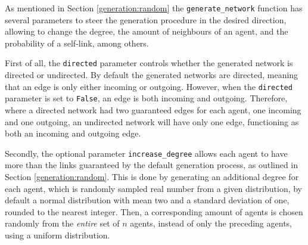 \documentclass[a4paper, 12pt]{report}
\begin{document}
As mentioned in Section \ref{generation:random} the \texttt{generate\_network} function has several parameters to steer the generation procedure in the desired direction, allowing to change the degree, the amount of neighbours of an agent, and the probability of a self-link, among others. 

\noindent First of all, the \texttt{directed} parameter controls whether the generated network is directed or undirected. By default the generated networks are directed, meaning that an edge is only either incoming or outgoing. However, when the \texttt{directed} parameter is set to \texttt{False}, an edge is both incoming and outgoing. Therefore, where a directed network had two guaranteed edges for each agent, one incoming and one outgoing, an undirected network will have only one edge, functioning as both an incoming and outgoing edge.

\noindent Secondly, the optional parameter \texttt{increase\_degree} allows each agent to have more than the links guaranteed by the default generation process, as outlined in Section \ref{generation:random}. This is done by generating an additional degree for each agent, which is randomly sampled real number from a given distribution, by default a normal distribution with mean two and a standard deviation of one, rounded to the nearest integer. Then, a corresponding amount of agents is chosen randomly from the \emph{entire} set of $n$ agents, instead of only the preceding agents, using a uniform distribution.
\end{document}
